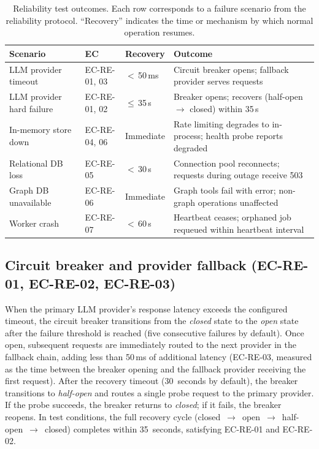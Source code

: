 \documentclass[a4paper,noexaminfo]{sapthesis}
\begin{document}
\begin{table}[ht]
\centering
\caption{Reliability test outcomes.  Each row corresponds to a failure
scenario from the reliability protocol.  ``Recovery'' indicates the time
or mechanism by which normal operation resumes.}
\label{tab:reliability-results}
\small
\begin{tabularx}{\textwidth}{@{}l l l X@{}}
    \hline
    \textbf{Scenario} & \textbf{EC} & \textbf{Recovery} &
        \textbf{Outcome} \\
    \hline
    LLM provider timeout &
        EC-RE-01, 03 &
        $<$\,50\,ms &
        Circuit breaker opens; fallback provider serves requests \\
    LLM provider hard failure &
        EC-RE-01, 02 &
        $\leq$\,35\,s &
        Breaker opens; recovers (half-open $\to$ closed) within 35\,s \\
    In-memory store down &
        EC-RE-04, 06 &
        Immediate &
        Rate limiting degrades to in-process; health probe reports
        degraded \\
    Relational DB loss &
        EC-RE-05 &
        $<$\,30\,s &
        Connection pool reconnects; requests during outage receive
        503 \\
    Graph DB unavailable &
        EC-RE-06 &
        Immediate &
        Graph tools fail with error; non-graph operations unaffected \\
    Worker crash &
        EC-RE-07 &
        $<$\,60\,s &
        Heartbeat ceases; orphaned job requeued within heartbeat
        interval \\
    \hline
\end{tabularx}
\end{table}

\subsection{Circuit breaker and provider fallback (EC-RE-01, EC-RE-02,
EC-RE-03)}

When the primary LLM provider's response latency exceeds the configured
timeout, the circuit breaker transitions from the \emph{closed} state to
the \emph{open} state after the failure threshold is reached (five
consecutive failures by default).  Once open, subsequent requests are
immediately routed to the next provider in the fallback chain, adding
less than 50\,ms of additional latency (EC-RE-03, measured as the time
between the breaker opening and the fallback provider receiving the
first request).  After the recovery timeout (30~seconds by default), the
breaker transitions to \emph{half-open} and routes a single probe
request to the primary provider.  If the probe succeeds, the breaker
returns to \emph{closed}; if it fails, the breaker reopens.  In test
conditions, the full recovery cycle (closed~$\to$~open~$\to$~half-open~$\to$~closed)
completes within 35~seconds, satisfying EC-RE-01 and EC-RE-02.
\end{document}
